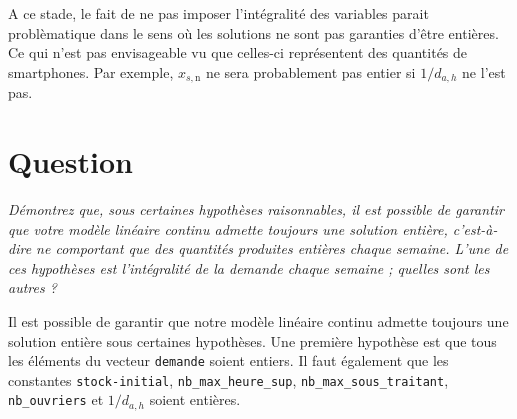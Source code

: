 \documentclass[12pt,oneside,a4paper]{article}
\newcommand{\question}
{
\addtocounter{section}{1}
\section*{Question \thesection}
}
\newcommand{\myX}[2]{x_{#1,\text{#2}}}
\newcommand{\xSemaine}[1]{\myX{s}{#1}}
\newcommand{\xn}{\xSemaine{n}}
\begin{document}
A ce stade, le fait de ne pas imposer l'intégralité des variables
parait problèmatique dans le sens où les solutions ne sont pas 
garanties d'être entières. Ce qui n'est pas envisageable 
vu que celles-ci représentent des quantités de smartphones.
Par exemple, 
$\xn$ ne sera probablement pas entier si $1/d_{a,h}$ ne l'est pas.

\question %
\emph{Démontrez que, sous certaines hypothèses raisonnables, 
il est possible de garantir que votre modèle linéaire continu admette toujours
une solution entière, c'est-à-dire ne comportant que des quantités produites
entières chaque semaine. 
L'une de ces hypothèses est l'intégralité de la demande chaque semaine ; 
quelles sont les autres ?}

Il est possible de garantir que notre modèle linéaire continu
admette toujours une solution entière sous certaines hypothèses.
Une première hypothèse est que tous les éléments du 
vecteur \texttt{demande} soient entiers.
Il faut également que les constantes \texttt{stock-initial},
\texttt{nb\_max\_heure\_sup}, \texttt{nb\_max\_sous\_traitant},
\texttt{nb\_ouvriers} et $1/d_{a,h}$ soient entières.
\end{document}
